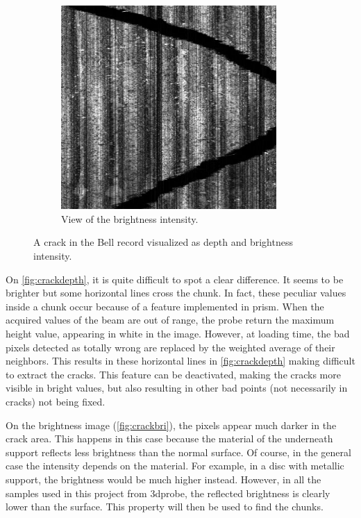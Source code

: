 \begin{figure}[!ht]
\begin{subfigure}[t]{0.45\textwidth}
    \includegraphics[width=0.9\textwidth]{images/bell-crack-bri}
    \caption{View of the brightness intensity.}
    \label{fig:crackbri}
    \end{subfigure}
    \caption{A crack in the Bell record visualized as depth and brightness intensity.}
    \label{fig:crackdepthbri}
\end{figure}

On \autoref{fig:crackdepth}, it is quite difficult to spot a clear difference. It seems to be brighter but some horizontal lines cross the chunk. In fact, these peculiar values inside a chunk occur because of a feature implemented in \gls{prism}. When the acquired values of the beam are out of range, the probe return the maximum height value, appearing in white in the image. However, at loading time, the bad pixels detected as totally wrong are replaced by the weighted average of their neighbors. This results in these horizontal lines in \autoref{fig:crackdepth} making difficult to extract the cracks. This feature can be deactivated, making the cracks more visible in bright values, but also resulting in other bad points (not necessarily in cracks) not being fixed.

On the brightness image (\autoref{fig:crackbri}), the pixels appear much darker in the crack area. This happens in this case because the material of the underneath support reflects less brightness than the normal surface. Of course, in the general case the intensity depends on the material. For example, in a disc with metallic support, the brightness would be much higher instead. However, in all the samples used in this project from \gls{3dprobe}, the reflected brightness is clearly lower than the surface. This property will then be used to find the chunks.

